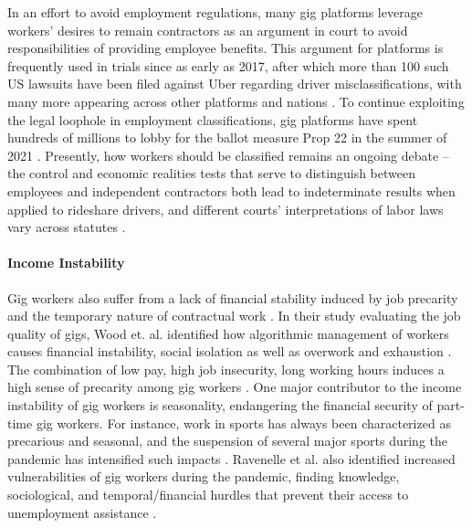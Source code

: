 In an effort to avoid employment regulations, many gig platforms leverage workers' desires to remain contractors as an argument in court to avoid responsibilities of providing employee benefits. This argument for platforms is frequently used in trials since as early as 2017, after which more than 100 such US lawsuits have been filed against Uber regarding driver misclassifications, with many more appearing across other platforms and nations \cite{employment, category}. To continue exploiting the legal loophole in employment classifications, gig platforms have spent hundreds of millions to lobby for the ballot measure Prop 22 in the summer of 2021 \cite{UwCF}. Presently, how workers should be classified remains an ongoing debate -- the control and economic realities tests that serve to distinguish between employees and independent contractors both lead to indeterminate results when applied to rideshare drivers, and different courts'  interpretations of labor laws vary across statutes \cite{category, harris2015proposal}.

\paragraph{Income Instability}
Gig workers also suffer from a lack of financial stability induced by job precarity and the temporary nature of contractual work \cite{paNg}. In their study evaluating the job quality of gigs, Wood et. al. identified {how} algorithmic management of workers cause{s} financial instability, social isolation as well as overwork and exhaustion \cite{good}. The combination of low pay, high job insecurity, long working hours induces a high sense of precarity among gig workers \cite{Dubal2017-bj,Hua2018-qx,precarity,Webster2016-gi,Vosko2006-ec}. One major contributor to the income instability of gig workers is seasonality, endangering the financial security of part-time gig workers. For instance, work in sports has always been characterized as precarious and seasonal, and the suspension of several major sports during the pandemic has intensified such impacts \cite{javits2022gig, sheptak2020sport}. Ravenelle et al. also identified increased vulnerabilities of gig workers during the pandemic, finding knowledge, sociological, and temporal/financial hurdles that prevent their access to unemployment assistance \cite{ravenelle2021side}.

